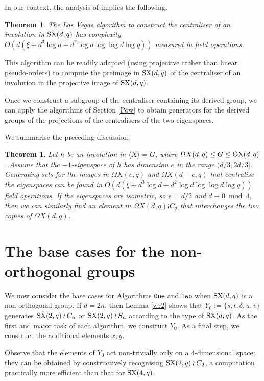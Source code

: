 \documentclass[12pt]{article}
\newtheorem{theorem}[definition]{Theorem}
\def\Oh{O}  %
\def\SX{{\rm SX}}
\def\GX{{\rm GX}}
\begin{document}
In our context, the analysis of 
\cite{Ryba-paper} implies the following.
\begin{theorem}
The Las Vegas algorithm to construct the centraliser
of an involution in $\SX(d, q)$ has complexity
$\Oh(d(\xi + d^3 \log d + d^2 \log d \log\log d\log q))$ 
measured in field operations.
\end{theorem}

This algorithm can be readily adapted (using projective rather
than linear pseudo-orders) to compute the preimage in 
$\SX(d, q)$ of the centraliser of an involution in the 
projective image of $\SX(d, q)$.

Once we construct a subgroup of  the centraliser containing
its derived group, we can apply 
the algorithms of Section \ref{Pow} 
to obtain generators for the derived
groups of the projections of the
centralisers of the two eigenspaces. 

We summarise the preceding discussion. 
\begin{theorem}
Let $h$ be an involution in $\langle X \rangle = G$, where
$\Omega X(d, q) \leq G \leq \GX(d, q)$. Assume that the 
$-1$-eigenspace of $h$ has dimension $e$ in the range $(d/3, 2d/3]$.
Generating sets for the images in 
$\Omega X(e, q)$ and $\Omega X(d - e, q)$ that centralise
the eigenspaces can be found in 
$\Oh(d(\xi + d^3 \log d + d^2 \log d \log\log d\log q))$ 
field operations.
If the eigenspaces are isometric, so $e = d/2$ and $d \equiv 0 \bmod 4$, then
we can similarly find an element in $\Omega X(d, q) \wr C_2$ that
interchanges the two copies of $\Omega X(d, q)$.
\end{theorem}

\section{The base cases for the non-orthogonal groups}
\label{base}
We now consider the base cases for 
Algorithms {\tt One} and {\tt Two} when $\SX (d, q)$ is
a non-orthogonal group.  If $d = 2n$, then Lemma \ref{wr2} 
shows that $Y_0 := \{s, t, \delta, u, v \}$
generates $\SX(2, q) \wr C_n$  or $\SX(2, q) \wr S_n$
according to the type of $\SX (d, q)$. 
As the first and major task of each algorithm, we construct $Y_0$. 
As a final step, we construct the additional elements $x, y$.

Observe that the elements of $Y_0$ act non-trivially
only on a 4-dimensional space; they can be obtained by 
constructively recognising $\SX(2, q) \wr C_2$, a 
computation practically more efficient than that for $\SX(4, q)$.
\end{document}
